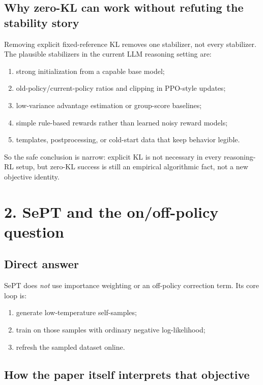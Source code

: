\documentclass[11pt]{article}
\begin{document}
\subsection*{Why zero-KL can work without refuting the stability story}

Removing explicit fixed-reference KL removes one stabilizer, not every stabilizer. The plausible stabilizers in the current LLM reasoning setting are:

\begin{enumerate}
\item strong initialization from a capable base model;
\item old-policy/current-policy ratios and clipping in PPO-style updates;
\item low-variance advantage estimation or group-score baselines;
\item simple rule-based rewards rather than learned noisy reward models;
\item templates, postprocessing, or cold-start data that keep behavior legible.
\end{enumerate}

So the safe conclusion is narrow: explicit KL is not necessary in every reasoning-RL setup, but zero-KL success is still an empirical algorithmic fact, not a new objective identity.

\section*{2. SePT and the on/off-policy question}

\subsection*{Direct answer}

SePT does \emph{not} use importance weighting or an off-policy correction term. Its core loop is:

\begin{enumerate}
\item generate low-temperature self-samples;
\item train on those samples with ordinary negative log-likelihood;
\item refresh the sampled dataset online.
\end{enumerate}

\subsection*{How the paper itself interprets that objective}
\end{document}

